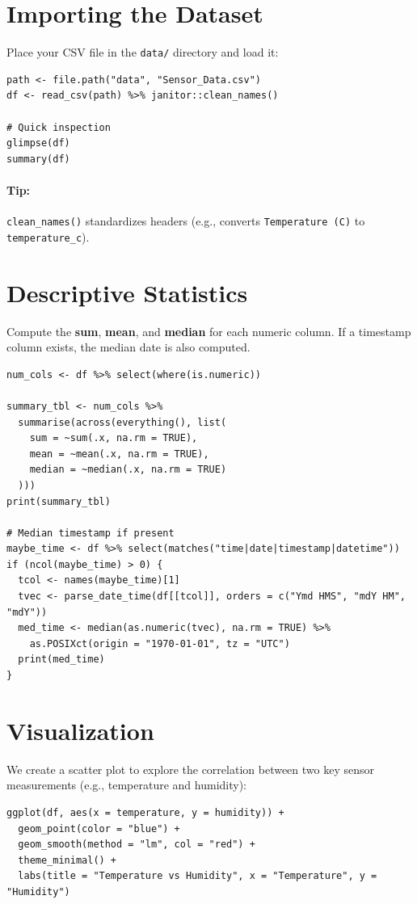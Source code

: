 \documentclass[12pt]{article}
\begin{document}
\section{Importing the Dataset}
Place your CSV file in the \texttt{data/} directory and load it:

\begin{lstlisting}
path <- file.path("data", "Sensor_Data.csv")
df <- read_csv(path) %>% janitor::clean_names()

# Quick inspection
glimpse(df)
summary(df)
\end{lstlisting}

\paragraph{Tip:} \texttt{clean\_names()} standardizes headers (e.g., converts \texttt{Temperature (C)} to \texttt{temperature\_c}).

\section{Descriptive Statistics}
Compute the \textbf{sum}, \textbf{mean}, and \textbf{median} for each numeric column. If a timestamp column exists, the median date is also computed.

\begin{lstlisting}
num_cols <- df %>% select(where(is.numeric))

summary_tbl <- num_cols %>%
  summarise(across(everything(), list(
    sum = ~sum(.x, na.rm = TRUE),
    mean = ~mean(.x, na.rm = TRUE),
    median = ~median(.x, na.rm = TRUE)
  )))
print(summary_tbl)

# Median timestamp if present
maybe_time <- df %>% select(matches("time|date|timestamp|datetime"))
if (ncol(maybe_time) > 0) {
  tcol <- names(maybe_time)[1]
  tvec <- parse_date_time(df[[tcol]], orders = c("Ymd HMS", "mdY HM", "mdY"))
  med_time <- median(as.numeric(tvec), na.rm = TRUE) %>%
    as.POSIXct(origin = "1970-01-01", tz = "UTC")
  print(med_time)
}
\end{lstlisting}

\section{Visualization}
We create a scatter plot to explore the correlation between two key sensor measurements (e.g., temperature and humidity):

\begin{lstlisting}
ggplot(df, aes(x = temperature, y = humidity)) +
  geom_point(color = "blue") +
  geom_smooth(method = "lm", col = "red") +
  theme_minimal() +
  labs(title = "Temperature vs Humidity", x = "Temperature", y = "Humidity")
\end{lstlisting}
\end{document}
